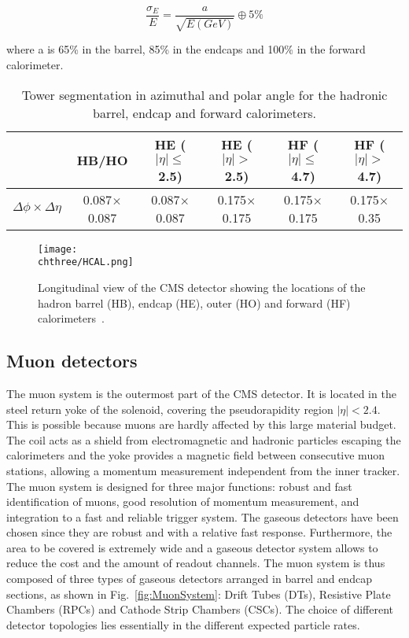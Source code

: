 \begin{equation}
\frac{\sigma_E}{E} = \frac{a}{\sqrt{E(GeV)}} \oplus 5\%
\end{equation}

where a is 65\% in the barrel, 85\% in the endcaps and 100\% in the forward calorimeter.

\begin{table}[!htb]
\centering
\caption{Tower segmentation in azimuthal and polar angle for the hadronic barrel, endcap and forward calorimeters.}
\begin{tabular}{c|c|c|c|c|c}
                                              & HB/HO                      & HE ($|\eta|\leq$2.5) & HE ($|\eta|>$2.5)     & HF ($|\eta|\leq$4.7) & HF ($|\eta|>$4.7) \\ \hline\hline
$\Delta\phi\times\Delta\eta$  & 0.087$\times$0.087 & 0.087$\times$0.087 & 0.175$\times$0.175 & 0.175$\times$0.175 & 0.175$\times$0.35
\end{tabular}
\label{tab:hcal}
\end{table}

\begin{figure}[!htb]
 \begin{center}
  \texttt{[image: \\chthree/HCAL.png]}
 \end{center}
 \caption{Longitudinal view of the CMS detector showing the locations of the hadron barrel (HB), endcap (HE), outer (HO) and forward (HF) calorimeters~\cite{Chatrchyan:2008zzk}.}
 \label{fig:HCALLayout}
\end{figure}

\subsection{Muon detectors}\label{subsec:muonchambers}

The muon system is the outermost part of the CMS detector. It is located in the steel return yoke of the solenoid, covering the pseudorapidity region $|\eta| < 2.4$. This is possible because muons are hardly affected by this large material budget. The coil acts as a shield from electromagnetic and hadronic particles escaping the calorimeters and the yoke provides a magnetic field between consecutive muon stations, allowing a momentum measurement independent from the inner tracker. The muon system is designed for three major functions: robust and fast identification of muons, good resolution of momentum measurement, and integration to a fast and reliable trigger system. The gaseous detectors have been chosen since they are robust and with a relative fast response. Furthermore, the area to be covered is extremely wide and a gaseous detector system allows to reduce the cost and the amount of readout channels. The muon system is thus composed of three types of gaseous detectors arranged in barrel and endcap sections, as shown in Fig.~\ref{fig:MuonSystem}: Drift Tubes (DTs), Resistive Plate Chambers (RPCs) and Cathode Strip Chambers (CSCs). The choice of different detector topologies lies essentially in the different expected particle rates. 


